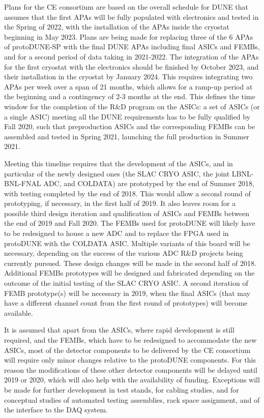 Plans for the CE consortium are based on the overall schedule for DUNE
that assumes that the first APAs will be fully populated with electronics
and tested in the Spring of 2022, with the installation of
the APAs inside the cryostat beginning in May 2023. Plans are being made
for replacing three of the 6 APAs of protoDUNE-SP with the final DUNE 
APAs including final ASICs and FEMBs, and for a second period of data
taking in 2021-2022. The integration of the
APAs for the first cryostat with the electronics should be finished by
October 2023, and their installation in the cryostat by January 2024.
This requires integrating two APAs per week over a span of 21 months,
which allows for a ramp-up period at the beginning and a contingency of
2-3 months at the end. This defines the time window for the completion of
the R\&D program on the ASICs: a set of ASICs (or a single ASIC) meeting
all the DUNE requirements has to be fully qualified by Fall 2020, such
that preproduction ASICs and the corresponding FEMBs can be assembled and
tested in Spring 2021, launching the full production in Summer 2021.

Meeting this timeline requires that the development of the ASICs, and in particular
of the newly designed ones (the SLAC CRYO ASIC, the joint LBNL-BNL-FNAL ADC,
and COLDATA) are prototyped by the end of Summer 2018, with testing
completed by the end of 2018. This would allow a second round of prototyping,
if necessary, in the first half of 2019. It also leaves room for a possible
third design iteration and qualification of ASICs and FEMBs between the
end of 2019 and Fall 2020. The FEMBs used for protoDUNE will
likely have to be redesigned to house a new ADC and to replace the FPGA used
in protoDUNE with the COLDATA ASIC. Multiple variants of this board will be
necessary, depending on the success of the various ADC R\&D projects being currently
pursued. These design changes will be made in the second half of 2018.
Additional FEMBs prototypes will be designed and fabricated depending on
the outcome of the initial testing of the SLAC CRYO ASIC. A second iteration
of FEMB prototype(s) will be necessary in 2019, when the final ASICs (that
may have a different channel count from the first round of prototypes) will become
available. 

It is assumed that apart from the ASICs, where rapid development is still
required, and the FEMBs, which have to be redesigned to accommodate the
new ASICs, most of the detector components to be delivered by the CE consortium
will require only minor changes relative to the protoDUNE components. For
this reason the modifications of these other detector components will
be delayed until 2019 or 2020, which will also help with the availability of funding.
Exceptions will be made for further development in test stands, for cabling
studies, and for conceptual studies of automated testing assemblies, rack space
assignment, and of the interface to the DAQ system.
